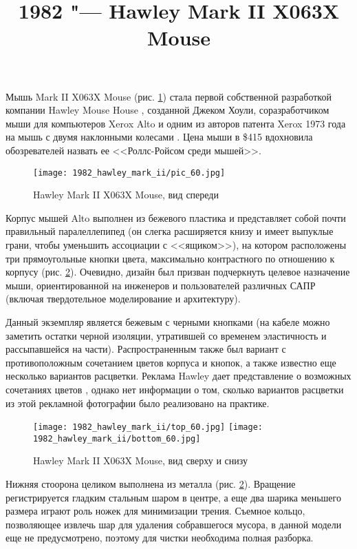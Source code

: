 \documentclass[11pt, a4paper]{article}
\begin{document}
\title{1982 "--- Hawley Mark II X063X Mouse}
\date{}
\maketitle
{}
Мышь Mark II X063X Mouse (рис. \ref{fig:HawleyMarkIIPic}) стала первой собственной разработкой компании Hawley Mouse House \cite{hawley,mouses}, созданной Джеком Хоули, соразработчиком мыши для компьютеров Xerox Alto и одним из авторов патента Xerox 1973 года на мышь с двумя наклонными колесами \cite{pat}. Цена мыши в \$415 \cite{buxton} вдохновила обозревателей назвать ее <<Роллс-Ройсом среди мышей>>.

\begin{figure}[h]
   \centering
    \texttt{[image: 1982\_hawley\_mark\_ii/pic\_60.jpg]}
    \caption{Hawley Mark II X063X Mouse, вид спереди}
    \label{fig:HawleyMarkIIPic}
\end{figure}

Корпус мышей Alto выполнен из бежевого пластика и представляет собой почти правильный паралеллепипед (он слегка расширяется книзу и имеет выпуклые грани, чтобы уменьшить ассоциации с <<ящиком>>), на котором расположены три прямоугольные кнопки цвета, максимально контрастного по отношению к корпусу (рис. \ref{fig:HawleyMarkIITopAndBottom}). Очевидно, дизайн был призван подчеркнуть целевое назначение мыши, ориентированной на инженеров и пользователей различных САПР (включая твердотельное моделирование и архитектуру).

Данный экземпляр является бежевым с черными кнопками (на кабеле можно заметить остатки черной изоляции, утратившей со временем эластичность и рассыпавшейся на части). Распространенным также был вариант с противоположным сочетанием цветов корпуса и кнопок, а также известно еще несколько вариантов расцветки. Реклама Hawley дает представление о возможных сочетаниях цветов \cite{brochure}, однако нет информации о том, сколько вариантов расцветки из этой рекламной фотографии было реализовано на практике.

\begin{figure}[h]
    \centering
    \texttt{[image: 1982\_hawley\_mark\_ii/top\_60.jpg]}
    \texttt{[image: 1982\_hawley\_mark\_ii/bottom\_60.jpg]}
    \caption{Hawley Mark II X063X Mouse, вид сверху и снизу}
    \label{fig:HawleyMarkIITopAndBottom}
\end{figure}



Нижняя стоорона целиком выполнена из металла (рис. \ref{fig:HawleyMarkIITopAndBottom}). Вращение регистрируется гладким стальным шаром в центре, а еще два шарика меньшего размера играют роль ножек для минимизации трения. Съемное кольцо, позволяющее извлечь шар для удаления собравшегося мусора, в данной модели еще не предусмотрено, поэтому для чистки необходима полная разборка.
\end{document}
